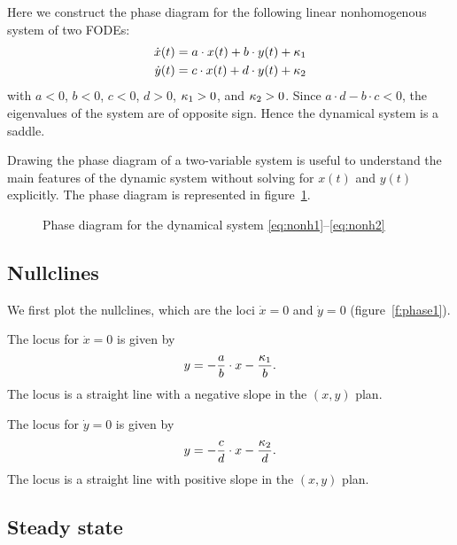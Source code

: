 \documentclass[letterpaper,12pt,leqno]{article}
\newcommand{\pdf}{phasediagrams.pdf}
\begin{document}
Here we construct the phase diagram for the following linear nonhomogenous system of two FODEs:
\begin{align}
\dot{x}(t) &=a\cdot x(t)+b\cdot y(t)+\kappa_{1}\label{eq:nonh1}\\
\dot{y}(t) &=c\cdot x(t)+d\cdot y(t)+\kappa_{2}\label{eq:nonh2}
\end{align}
with $a<0$, $b<0$, $c<0$, $d>0$, $\kappa_{1}>0$, and $\kappa_{2}>0$. Since $a\cdot d-b\cdot c<0$, the eigenvalues of the system are of opposite sign. Hence the dynamical system is a saddle.

Drawing the phase diagram of a two-variable system is useful to understand the main features of the dynamic system without solving for $x(t) $ and $y(t)$ explicitly. The phase diagram is represented in figure~\ref{f:phase}.

\begin{figure}[p]
\hfill
{}\vfig
{}\hfill
{}
\caption{Phase diagram for the dynamical system \eqref{eq:nonh1}--\eqref{eq:nonh2}}
\label{f:phase}\end{figure}


\subsection{Nullclines}

We first plot the nullclines, which are the loci $\dot{x}=0$ and $\dot{y}=0$ (figure~\ref{f:phase1}). 

The locus for $\dot{x}=0$ is given by
\begin{align*}
y=-\frac{a}{b}\cdot x-\frac{\kappa_{1}}{b}.
\end{align*}
The locus is a straight line with a negative slope in the $(x,y)$ plan. 

The locus for $\dot{y}=0$ is given by
\begin{align*}
y=-\frac{c}{d}\cdot x-\frac{\kappa_{2}}{d}.
\end{align*}
The locus is a straight line with positive slope in the $(x,y)$ plan.

\subsection{Steady state}
\end{document}
